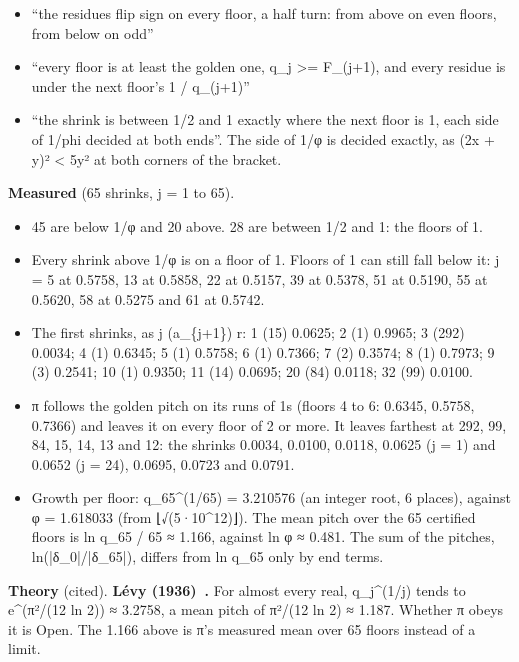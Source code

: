 \begin{itemize}
\item “the residues flip sign on every floor, a half turn: from above on even floors, from below on odd”
\item “every floor is at least the golden one, q\_\allowbreak{}j >= F\_\allowbreak{}(j+1), and every residue is under the next floor's 1 / q\_\allowbreak{}(j+1)”
\item “the shrink is between 1/2 and 1 exactly where the next floor is 1, each side of 1/phi decided at both ends”. The side of 1/φ is decided exactly, as (2x + y)² < 5y² at both corners of the bracket.
\end{itemize}

\textbf{Measured} (65 shrinks, j = 1 to 65).

\begin{itemize}
\item 45 are below 1/φ and 20 above. 28 are between 1/2 and 1: the floors of 1.
\item Every shrink above 1/φ is on a floor of 1. Floors of 1 can still fall below it: j = 5 at 0.5758, 13 at 0.5858, 22 at 0.5157, 39 at 0.5378, 51 at 0.5190, 55 at 0.5620, 58 at 0.5275 and 61 at 0.5742.
\item The first shrinks, as j (a\_\allowbreak{}\{j+1\}) r: 1 (15) 0.0625; 2 (1) 0.9965; 3 (292) 0.0034; 4 (1) 0.6345; 5 (1) 0.5758; 6 (1) 0.7366; 7 (2) 0.3574; 8 (1) 0.7973; 9 (3) 0.2541; 10 (1) 0.9350; 11 (14) 0.0695; 20 (84) 0.0118; 32 (99) 0.0100.
\item π follows the golden pitch on its runs of 1s (floors 4 to 6: 0.6345, 0.5758, 0.7366) and leaves it on every floor of 2 or more. It leaves farthest at 292, 99, 84, 15, 14, 13 and 12: the shrinks 0.0034, 0.0100, 0.0118, 0.0625 (j = 1) and 0.0652 (j = 24), 0.0695, 0.0723 and 0.0791.
\item Growth per floor: q\_\allowbreak{}65\textasciicircum{}(1/65) = 3.210576 (an integer root, 6 places), against φ = 1.618033 (from ⌊√(5·10\textasciicircum{}12)⌋). The mean pitch over the 65 certified floors is ln q\_\allowbreak{}65 / 65 ≈ 1.166, against ln φ ≈ 0.481. The sum of the pitches, ln(|δ\_\allowbreak{}0|/|δ\_\allowbreak{}65|), differs from ln q\_\allowbreak{}65 only by end terms.
\end{itemize}

\textbf{Theory} (cited). \textbf{Lévy (1936)~\cite{src:L-vy-1936}.} For almost every real, q\_\allowbreak{}j\textasciicircum{}(1/j) tends to e\textasciicircum{}(π²/(12 ln 2)) ≈ 3.2758, a mean pitch of π²/(12 ln 2) ≈ 1.187. Whether π obeys it is Open. The 1.166 above is π's measured mean over 65 floors instead of a limit.

